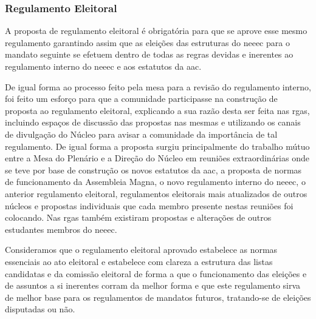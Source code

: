 
\subsubsection{Regulamento Eleitoral}

A proposta de regulamento eleitoral é obrigatória para que se aprove esse mesmo regulamento garantindo assim que as eleições das estruturas do \acrshort{neeec} para o mandato seguinte se efetuem dentro de todas as regras devidas e inerentes ao regulamento interno do \acrshort{neeec} e aos estatutos da \acrshort{aac}.

De igual forma ao processo feito pela mesa para a revisão do regulamento interno, foi feito um esforço para que a comunidade participasse na construção de proposta ao regulamento eleitoral, explicando a sua razão desta ser feita nas \acrshort{rga}s, incluindo espaços de discussão das propostas nas mesmas e utilizando os canais de divulgação do Núcleo para avisar a comunidade da importância de tal regulamento. De igual forma a proposta surgiu principalmente do trabalho mútuo entre a Mesa do Plenário e a Direção do Núcleo em reuniões extraordinárias onde se teve por base de construção os novos estatutos da \acrshort{aac}, a proposta de normas de funcionamento da Assembleia Magna, o novo regulamento interno do \acrshort{neeec}, o anterior regulamento eleitoral, regulamentos eleitorais mais atualizados de outros núcleos e propostas individuais que cada membro presente nestas reuniões foi colocando. Nas \acrshort{rga}s também existiram propostas e alterações de outros estudantes membros do \acrshort{neeec}.

Consideramos que o regulamento eleitoral aprovado estabelece as normas essenciais ao ato eleitoral e estabelece com clareza a estrutura das listas candidatas e da comissão eleitoral de forma a que o funcionamento das eleições e de assuntos a si inerentes corram da melhor forma e que este regulamento sirva de melhor base para os regulamentos de mandatos futuros, tratando-se de eleições disputadas ou não.